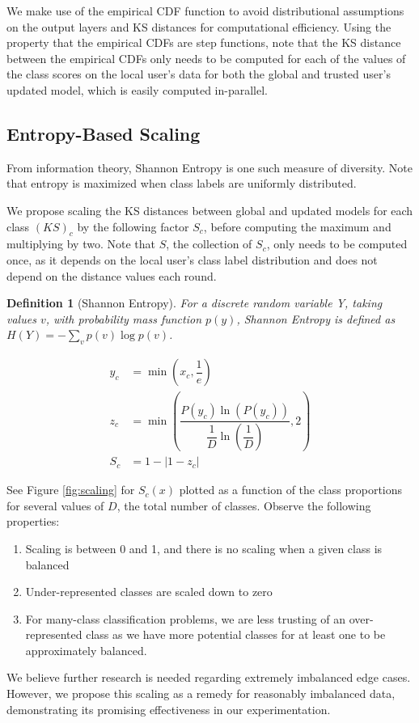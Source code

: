 \documentclass{article} %
\newtheorem{definition}{Definition}
\begin{document}
We make use of the empirical CDF function to avoid distributional assumptions on the output layers and KS distances for computational efficiency. Using the property that the empirical CDFs are step functions, note that the KS distance between the empirical CDFs only needs to be computed for each of the values of the class scores on the local user's data for both the global and trusted user's updated model, which is easily computed in-parallel.

%
\subsection{Entropy-Based Scaling}
From information theory, Shannon Entropy is one such measure of diversity. Note that entropy is maximized when class labels are uniformly distributed. 

We propose scaling the KS distances between global and updated models for each class $(KS)_c$ by the following factor $S_c$, before computing the maximum and multiplying by two. Note that $S$, the collection of $S_c$, only needs to be computed once, as it depends on the local user's class label distribution and does not depend on the distance values each round.

\begin{definition}[Shannon Entropy] For a discrete random variable Y, taking values $v$, with probability mass function $p(y)$, Shannon Entropy is defined as $H(Y) = - \sum_{v} p(v) \log p(v)$.
    
\end{definition}

\begin{align}
    y_c &= \min \left( x_c, \dfrac{1}{e} \right) \\
    z_c &= \min \left( \dfrac{P(y_c) \ln \left( P(y_c) \right)}{\dfrac{1}{D} \ln \left( \dfrac{1}{D} \right)}, 2 \right) \\
    S_c &= 1 - | 1 - z_c |    
\end{align}

See Figure \ref{fig:scaling} for $S_c(x)$ plotted as a function of the class proportions for several values of $D$, the total number of classes. Observe the following  properties:
\begin{enumerate}
    \item Scaling is between 0 and 1, and there is no scaling when a given class is balanced
    \item Under-represented classes are scaled down to zero
    \item For many-class classification problems, we are less trusting of an over-represented class as we have more potential classes for at least one to be approximately balanced.
\end{enumerate}

We believe further research is needed regarding extremely imbalanced edge cases. However, we propose this scaling as a remedy for reasonably imbalanced data, demonstrating its promising effectiveness in our experimentation.
\end{document}
